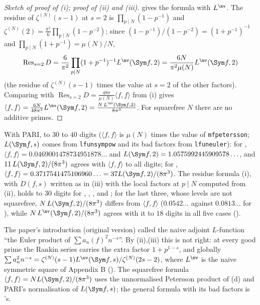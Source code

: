 \begin{proof}[Sketch of proof of (i); proof of (ii) and (iii)]
gives the formula with $L^{\nv}$. The residue of $\zeta^{(N)}(s-1)$ at $s=2$ is $\prod_{p\mid N}(1-p^{-1})$ and
$\zeta^{(N)}(2)=\frac{\pi^2}6\prod_{p\mid N}(1-p^{-2})$; since $(1-p^{-1})/(1-p^{-2})=(1+p^{-1})^{-1}$ and $\prod_{p\mid N}(1+p^{-1})=\mu(N)/N$,
\[
\operatorname{Res}_{s=2}D=\frac6{\pi^2}\prod_{p\mid N}(1+p^{-1})^{-1}L^{\nv}(\Sym f,2)=\frac{6N}{\pi^2\mu(N)}L^{\nv}(\Sym f,2)
\]
(the residue of $\zeta^{(N)}(s-1)$ times the value at $s=2$ of the other factors). Comparing with $\operatorname{Res}_{s=2}D=\frac{48\pi}{\mu(N)}\langle f,f\rangle$ from (i)
gives $\langle f,f\rangle=\frac{6N}{48\pi^3}L^{\nv}(\Sym f,2)=\frac{N\,L^{\nv}(\Sym f,2)}{8\pi^3}$. For squarefree $N$ there are no additive primes.
\end{proof}

\begin{example}\label{ex:hecke:rankin-numerics}
With PARI, to $30$ to $40$ digits ($\langle f,f\rangle$ is $\mu(N)$ times the value of \texttt{mfpetersson}; $L(\Sym f,s)$ comes from \texttt{lfunsympow} and its bad factors from
\texttt{lfuneuler}): for ,
$\langle f,f\rangle=0.0469001478734951878\ldots$ and $L(\Sym f,2)=1.0575992445909578\ldots$, and $11\,L(\Sym f,2)/(8\pi^3)$ agrees with $\langle f,f\rangle$ to all digits; for ,
$\langle f,f\rangle=0.3717541475106960\ldots=37L(\Sym f,2)/(8\pi^3)$. The residue formula (i), with $D(f,s)$ written as in (iii) with the local factors at $p\mid N$ computed from (ii), holds to $30$
digits for , , ,  and ; for the last three, whose levels are not squarefree, $N\,L(\Sym f,2)/(8\pi^3)$ differs from $\langle f,f\rangle$
($0.0542\ldots$ against $0.0813\ldots$ for ), while $N\,L^{\nv}(\Sym f,2)/(8\pi^3)$ agrees with it to $18$ digits in all five cases ().
\end{example}

\begin{warning}\label{warn:hecke:rankin}
The paper's introduction (original version) called the naive adjoint $L$-function ``the Euler product of $\sum a_n(f)^2n^{-s}$''. By (ii),(iii) this is not right: at
every good prime the Rankin series carries the extra factor $1+p^{1-s}$, and globally $\sum a_n^2n^{-s}=\zeta^{(N)}(s-1)L^{\nv}(\Sym f,s)/\zeta^{(N)}(2s-2)$, where $L^{\nv}$ is the naive symmetric square of
Appendix B (). The squarefree formula $\langle f,f\rangle=NL(\Sym f,2)/(8\pi^3)$ uses the unnormalised Petersson product of (d) and PARI's
normalisation of $L(\Sym f,s)$; the general formula with its bad factors is 's.
\end{warning}

